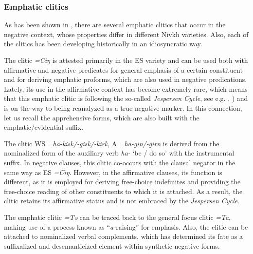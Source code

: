 \documentclass[output=paper,colorlinks,citecolor=brown]{langscibook}
\begin{document}
\subsubsection{Emphatic clitics}\label{sec:niv:4.6.2}

As has been shown in , there are several emphatic clitics that occur in the negative context, whose properties differ in different Nivkh varieties. Also, each of the clitics has been developing historically in an idiosyncratic way.

The clitic \textit{=Ciŋ} is attested primarily in the ES variety and can be used both with affirmative and negative predicates for general emphasis of a certain constituent and for deriving emphatic proforms, which are also used in negative predications. Lately, its use in the affirmative context has become extremely rare, which means that this emphatic clitic is following the so-called \textit{Jespersen Cycle}, see e.g. \citet{Auwera2009}, \citet{Jespersen2025}) and is on the way to being reanalyzed as a true negative marker. In this connection, let us recall the apprehensive forms, which are also built with the emphatic/evidential suffix.

The clitic WS \textit{=ha-kisk/-gisk/-kirk}, A \textit{=ha-gin/-girn} is derived from the nominalized form of the auxiliary verb \textit{ha-} ‘be / do so’ with the instrumental suffix. In negative clauses, this clitic co-occurs with the clausal negator in the same way as ES \textit{=Ciŋ}. However, in the affirmative clauses, its function is different, as it is employed for deriving free-choice indefinites and providing the free-choice reading of other constituents to which it is attached. As a result, the clitic retains its affirmative status and is not embraced by the \textit{Jespersen Cycle}.

The emphatic clitic \textit{=Tə} can be traced back to the general focus clitic \textit{=Ta}, making use of a process known as “\textit{a-}raising” for emphasis. Also, the clitic can be attached to nominalized verbal complements, which has determined its fate as a suffixalized and desemanticized element within synthetic negative forms.
\end{document}
